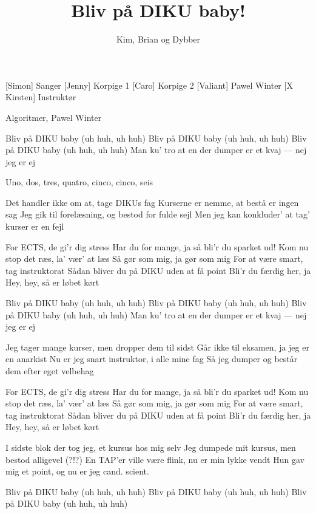 \documentclass[a4paper,11pt]{article}
\title{Bliv på DIKU baby!}
\author{Kim, Brian og Dybber}
\begin{document}
\maketitle

\begin{roles}
[Simon] Sanger
[Jenny] Korpige 1
[Caro] Korpige 2
[Valiant] Pawel Winter
[X Kirsten] Instruktør
\end{roles}

\begin{song}
 Algoritmer, Pawel Winter

 Bliv på DIKU baby  (uh huh, uh huh)
 Bliv på DIKU baby  (uh huh, uh huh)
 Bliv på DIKU baby  (uh huh, uh huh)
Man ku' tro at en der dumper er et kvaj --- nej jeg er ej

Uno, dos, tres, quatro, cinco, cinco, seis

Det handler ikke om at, tage DIKUs fag
Kurserne er nemme, at bestå er ingen sag
Jeg gik til forelæsning, og bestod for fulde sejl
Men jeg kan konkluder' at tag' kurser er en fejl

For ECTS, de gi'r dig stress
Har du for mange, ja så bli'r du sparket ud!
Kom nu stop det ræs, la' vær' at læs
Så gør som mig, ja gør som mig
For at være smart, tag instruktorat
Sådan bliver du på DIKU uden at få point
Bli'r du færdig her, ja
Hey, hey, så er løbet kørt

 Bliv på DIKU baby  (uh huh, uh huh)
 Bliv på DIKU baby  (uh huh, uh huh)
 Bliv på DIKU baby  (uh huh, uh huh)
Man ku' tro at en der dumper er et kvaj --- nej jeg er ej

Jeg tager mange kurser, men dropper dem til sidst
Går ikke til eksamen, ja jeg er en anarkist
Nu er jeg snart instruktor, i alle mine fag
Så jeg dumper og består dem efter eget velbehag

For ECTS, de gi'r dig stress
Har du for mange, ja så bli'r du sparket ud!
Kom nu stop det ræs, la' vær' at læs
Så gør som mig, ja gør som mig
For at være smart, tag instruktorat
Sådan bliver du på DIKU uden at få point
Bli'r du færdig her, ja
Hey, hey, så er løbet kørt

I sidste blok der tog jeg, et kursus hos mig selv
Jeg dumpede mit kursus, men bestod alligevel (?!?)
En TAP'er ville være flink, nu er min lykke vendt
Hun gav mig et point, og nu er jeg cand. scient.

 Bliv på DIKU baby  (uh huh, uh huh)
 Bliv på DIKU baby  (uh huh, uh huh)
 Bliv på DIKU baby  (uh huh, uh huh)


\end{song}
\end{document}
